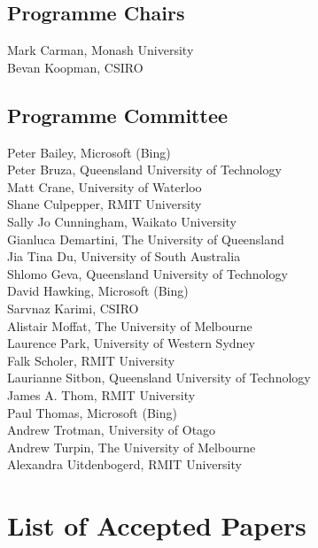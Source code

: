 \documentclass[a4paper]{article}
\begin{document}
\subsection*{Programme Chairs}

Mark Carman, Monash University\\
Bevan Koopman, CSIRO\\

\subsection*{Programme Committee}
Peter Bailey, Microsoft (Bing)\\
Peter Bruza, Queensland University of Technology\\
Matt Crane, University of Waterloo\\
Shane Culpepper, RMIT University\\
Sally Jo Cunningham, Waikato University\\
Gianluca Demartini, The University of Queensland\\
Jia Tina Du, University of South Australia\\
Shlomo Geva, Queensland University of Technology\\
David Hawking, Microsoft (Bing)\\
Sarvnaz Karimi, CSIRO\\
Alistair Moffat, The University of Melbourne\\
Laurence Park, University of Western Sydney\\
Falk Scholer, RMIT University\\
Laurianne Sitbon, Queensland University of Technology\\
James A. Thom, RMIT University\\
Paul Thomas, Microsoft (Bing)\\
Andrew Trotman, University of Otago\\
Andrew Turpin, The University of Melbourne\\
Alexandra Uitdenbogerd, RMIT University\\

\newpage

\section*{List of Accepted Papers}
\end{document}
